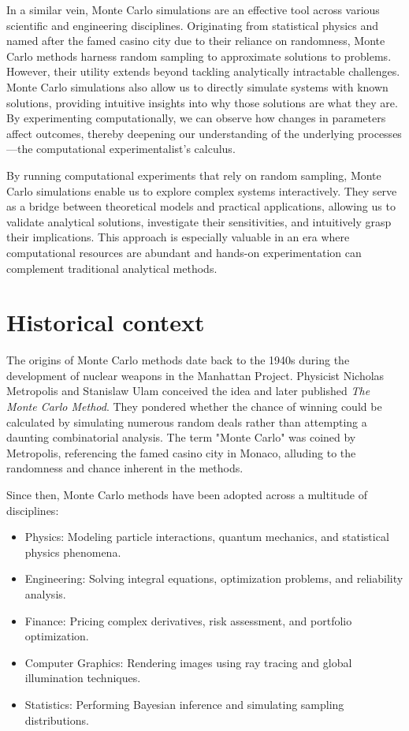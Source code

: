 \documentclass[final,5p,times,twocolumn,authoryear]{elsarticle}
\begin{document}
In a similar vein, Monte Carlo simulations are an effective tool across various scientific and engineering disciplines. Originating from statistical physics and named after the famed casino city due to their reliance on randomness, Monte Carlo methods harness random sampling to approximate solutions to problems. However, their utility extends beyond tackling analytically intractable challenges. Monte Carlo simulations also allow us to directly simulate systems with known solutions, providing intuitive insights into why those solutions are what they are. By experimenting computationally, we can observe how changes in parameters affect outcomes, thereby deepening our understanding of the underlying processes—the computational experimentalist's calculus.

By running computational experiments that rely on random sampling, Monte Carlo simulations enable us to explore complex systems interactively. They serve as a bridge between theoretical models and practical applications, allowing us to validate analytical solutions, investigate their sensitivities, and intuitively grasp their implications. This approach is especially valuable in an era where computational resources are abundant and hands-on experimentation can complement traditional analytical methods.

\section{Historical context}

The origins of Monte Carlo methods date back to the 1940s during the development of nuclear weapons in the Manhattan Project. Physicist Nicholas Metropolis and Stanislaw Ulam  conceived the idea and later published \textit{The Monte Carlo Method}. They pondered whether the chance of winning could be calculated by simulating numerous random deals rather than attempting a daunting combinatorial analysis. The term "Monte Carlo" was coined by Metropolis, referencing the famed casino city in Monaco, alluding to the randomness and chance inherent in the methods.

Since then, Monte Carlo methods have been adopted across a multitude of disciplines:

\begin{itemize}
\itemsep0em
  \item Physics: Modeling particle interactions, quantum mechanics, and statistical physics phenomena.
  \item Engineering: Solving integral equations, optimization problems, and reliability analysis.
  \item Finance: Pricing complex derivatives, risk assessment, and portfolio optimization.
  \item Computer Graphics: Rendering images using ray tracing and global illumination techniques.
  \item Statistics: Performing Bayesian inference and simulating sampling distributions.
\end{itemize}
\end{document}
